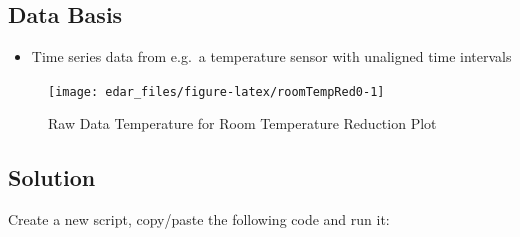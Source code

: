 \documentclass[
  a4paperpaper,
]{book}
\providecommand{\tightlist}{%
  \setlength{\itemsep}{0pt}\setlength{\parskip}{0pt}}
\begin{document}
\hypertarget{data-basis-22}{%
\subsection{Data Basis}\label{data-basis-22}}

\begin{itemize}
\tightlist
\item
  Time series data from e.g.~a temperature sensor with unaligned time intervals
\end{itemize}

\begin{figure}
\texttt{[image: edar\_files/figure-latex/roomTempRed0-1]} \caption{Raw Data Temperature for Room Temperature Reduction Plot}\label{fig:roomTempRed0}
\end{figure}

\newpage

\hypertarget{solution-22}{%
\subsection{Solution}\label{solution-22}}

Create a new script, copy/paste the following code and run it:
\end{document}
